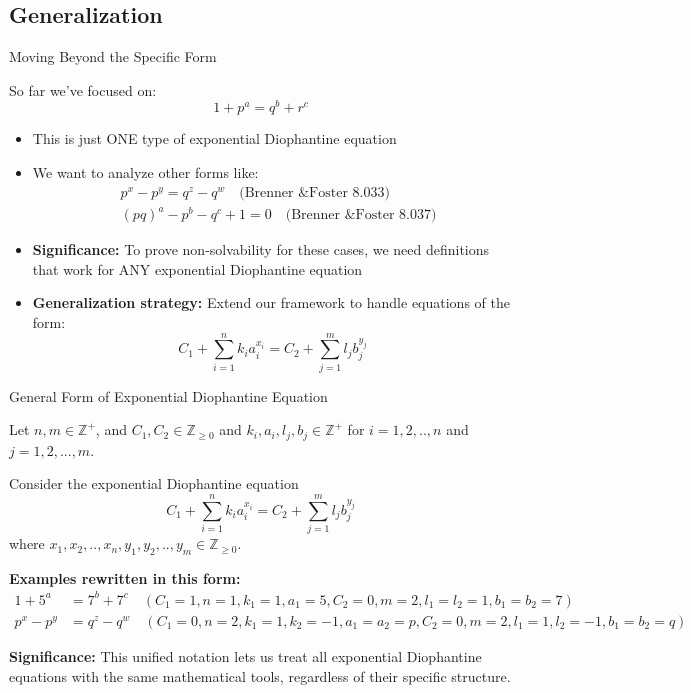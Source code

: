 ﻿\documentclass[10pt,aspectratio=169]{beamer}
\begin{document}
\subsection{Generalization}
\begin{frame}{Moving Beyond the Specific Form}
    \begin{block}{So far we've focused on:}
        \[1+p^a = q^b + r^c\]
    \end{block}
    
    \begin{itemize}
        \item This is just ONE type of exponential Diophantine equation
        \item We want to analyze other forms like:
        \begin{align*}
            &p^x - p^y = q^z - q^w \quad \text{(Brenner \& Foster 8.033)}\\
            &(pq)^a - p^b - q^c + 1 = 0 \quad \text{(Brenner \& Foster 8.037)}
        \end{align*}
        
        \item \textbf{Significance:} To prove non-solvability for these cases, we need definitions that work for ANY exponential Diophantine equation
        
        \item \textbf{Generalization strategy:} Extend our framework to handle equations of the form:
        \[C_1 + \sum_{i=1}^n k_i a_i^{x_i} = C_2 + \sum_{j=1}^m l_j b_j^{y_j}\]
    \end{itemize}
\end{frame}

\begin{frame}{General Form of Exponential Diophantine Equation}
    \begin{definition}
        Let $n,m \in \mathbb{Z}^{+}$, and $C_1, C_2 \in \mathbb{Z}_{\geq 0}$ and $k_i, a_i, l_j, b_j \in \mathbb{Z}^{+}$ for $i=1,2,..,n$ and $j=1,2,...,m$. 
        
        Consider the exponential Diophantine equation
        \begin{equation}
            C_1 + \sum_{i=1}^n k_i a_i^{x_i} = C_2 + \sum_{j=1}^m l_j b_j^{y_j} \label{general}
        \end{equation}
        where $x_1,x_2,..,x_n, y_1,y_2,..,y_m \in \mathbb{Z}_{\geq 0}$.
    \end{definition}
    
    \textbf{Examples rewritten in this form:}
    \begin{align*}
        1 + 5^a &= 7^b + 7^c \quad (C_1=1, n=1, k_1=1, a_1=5, C_2=0, m=2, l_1=l_2=1, b_1=b_2=7)\\
        p^x - p^y &= q^z - q^w \quad (C_1=0, n=2, k_1=1, k_2=-1, a_1=a_2=p, C_2=0, m=2, l_1=1, l_2=-1, b_1=b_2=q)
    \end{align*}
    
    \textbf{Significance:} This unified notation lets us treat all exponential Diophantine equations with the same mathematical tools, regardless of their specific structure.
\end{frame}
\end{document}
